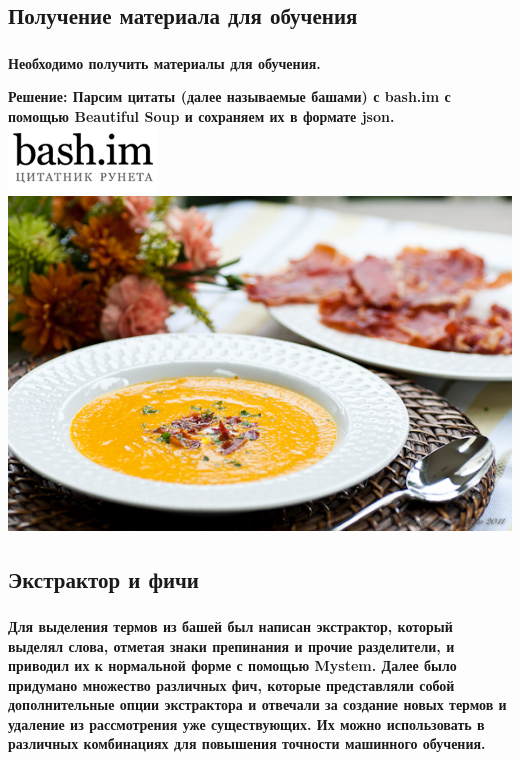 \documentclass[t]{beamer}
\begin{document}
	\subsection{Получение материала для обучения}
	\begin{frame}
		\frametitle{\insertsection}
		\framesubtitle{\insertsubsection}
		\textbf{Необходимо получить материалы для обучения.}\pause
		
		\textbf{Решение: \newline Парсим цитаты (далее называемые башами) с bash.im с помощью Beautiful Soup и сохраняем их в формате json.}
		\includegraphics[scale = 0.8]{images/bash_im.png}
		\includegraphics[scale = 0.3]{images/beautiful_soup.jpg}
	\end{frame}
	
	
	\subsection{Экстрактор и фичи}
	\begin{frame}
		\frametitle{\insertsection}
		\framesubtitle{\insertsubsection}
		\textbf{Для выделения термов из башей был написан экстрактор, который выделял слова, отметая знаки препинания и прочие разделители, и приводил их к нормальной форме с помощью Mystem. Далее было придумано множество различных фич, которые представляли собой дополнительные опции экстрактора и отвечали за создание новых термов и удаление из рассмотрения уже существующих. Их можно использовать в различных комбинациях для повышения точности машинного обучения.}
	\end{frame}
	
\end{document}
